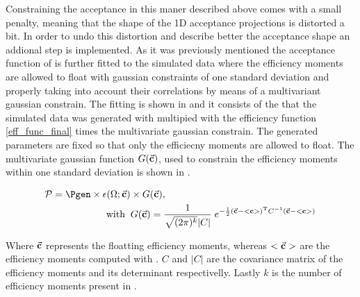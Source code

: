 Constraining the acceptance in this maner described above comes with a small penalty, meaning that the shape of the 1D acceptance
projections is distorted a bit. In order to undo this distortion and describe better the acceptance shape an addional step is implemented. 
As it was previously mentioned the acceptance function of  is further fitted to the simulated data where the efficiency
moments are allowed to float with gaussian constraints of one standard deviation and properly taking into account their correlations by
means of a multivariant gaussian constrain. The fitting \pdf is shown in  and it consists of the \pdf that the simulated 
data was generated with multipied with the efficiency function \eqref{eff_func_final} times the multivariate gaussian constrain. 
The generated parameters are fixed so that only the efficiecny moments are allowed to float.     
The multivariate gaussian function $G(\vec{\bf{c}})$, used to constrain the efficiency moments within one standard deviation is shown in .

\begin{center}
\begin{align}
  \mathcal{P}= \Pgen \times\epsilon(\Omega;\vec{\bf c})&  \times G(\vec{\bf{c}}), \nonumber\\ 
  \text{with} \;\; & G(\vec{\bf{c}}) = \frac{1}{\sqrt{(2\pi)^k}|C|} \; e^{-\frac{1}{2}(  \vec{\bf{c}} - <{\bf{c}}>  )^{\text{T}} C^{-1} (\vec{\bf{c}} - <{\bf{c}}> ) }
  \label{mvm_constr}
\end{align}
\end{center}

\noindent Where $\vec{\bf c}$ represents the floatting efficiency moments, whereas $<\vec{\bf c}>$ are the efficiency moments computed
with . $C$ and $|C|$ are the covariance matrix of the efficiency moments and its determinant respectivelly.
Lastly $k$ is the number of efficiency moments present in . 

